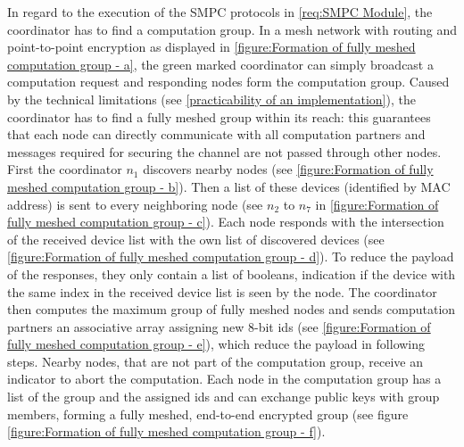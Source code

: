 In regard to the execution of the \gls{SMPC} protocols in \ref{req:SMPC Module}, the coordinator has to find a computation group. In a mesh network with routing and point-to-point encryption as displayed in \autoref{figure:Formation of fully meshed computation group - a}, the green marked coordinator can simply broadcast a computation request and responding nodes form the computation group. Caused by the technical limitations (see \autoref{practicability of an implementation}), the coordinator has to find a fully meshed group within its reach: this guarantees that each node can directly communicate with all computation partners and messages required for securing the channel are not passed through other nodes. First the coordinator $n_1$ discovers nearby nodes (see \autoref{figure:Formation of fully meshed computation group - b}). Then a list of these devices (identified by \gls{MAC} address) is sent to every neighboring node (see $n_2$ to $n_7$ in \autoref{figure:Formation of fully meshed computation group - c}). Each node responds with the intersection of the received device list with the own list of discovered devices (see \autoref{figure:Formation of fully meshed computation group - d}). To reduce the payload of the responses, they only contain a list of booleans, indication if the device with the same index in the received device list is seen by the node. The coordinator then computes the maximum group of fully meshed nodes and sends computation partners an associative array assigning new 8-bit ids (see \autoref{figure:Formation of fully meshed computation group - e}), which reduce the payload in following steps. Nearby nodes, that are not part of the computation group, receive an indicator to abort the computation. Each node in the computation group has a list of the group and the assigned ids and can exchange public keys with group members, forming a fully meshed, end-to-end encrypted group (see figure \ref{figure:Formation of fully meshed computation group - f}).


